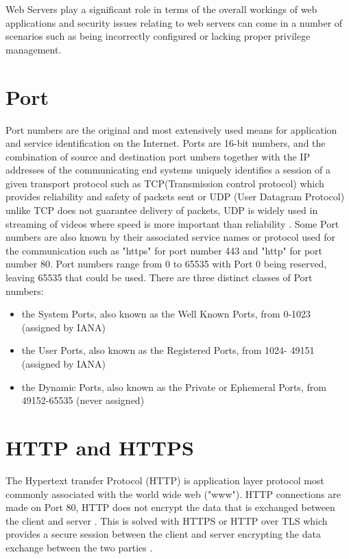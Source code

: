 \documentclass[a4wide,leqno,12pt]{report}
\begin{document}
Web Servers play a significant role in terms of the overall workings of web applications and security issues relating to web servers can come in a number of scenarios such as being incorrectly configured\cite{mendes2008assessing} or lacking proper privilege management.
\section{Port}
Port numbers are the original and most extensively used means for application and service identification on the Internet. Ports are 16-bit numbers, and the combination of source and destination port umbers together with the IP addresses of the communicating end systems uniquely identifies a session of a given transport protocol \cite{cotton2011internet} such as TCP(Transmission control protocol) which provides reliability and safety of packets sent  or UDP (User Datagram Protocol) unlike TCP does not guarantee delivery of packets, UDP is widely used in streaming of videos where speed is more important than reliability \cite{khan2016transport}. Some Port numbers are also known by their associated service names or protocol used for the communication such as "https" for port number 443 and "http" for port number 80. Port numbers range from 0 to 65535 with Port 0 being reserved, leaving 65535 that could be used. There are three distinct classes of Port numbers:

\begin{itemize}
\item the System Ports, also known as the Well Known Ports, from 0-1023
      (assigned by IANA)
\item the User Ports, also known as the Registered Ports, from 1024-
      49151 (assigned by IANA)
\item the Dynamic Ports, also known as the Private or Ephemeral Ports,
      from 49152-65535 (never assigned)
\end{itemize}
\section{HTTP and HTTPS}
The Hypertext transfer Protocol (HTTP) is application layer protocol most commonly associated with the world wide web ("www"). HTTP connections are made on Port 80, HTTP does not encrypt the data that is exchanged between the client and server \cite{fielding1999hypertext}. This is solved with HTTPS or HTTP over TLS which provides a secure session between the client and server encrypting the data exchange between the two parties \cite{rescorla2000http}. 
\end{document}
